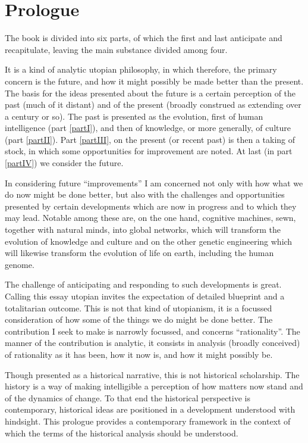 
\mainmatter

\part{Prologue}\label{part0}


The book is divided into six parts, of which the first and last anticipate and recapitulate, leaving the main substance divided among four.

It is a kind of analytic utopian philosophy, in which therefore, the primary concern is the future, and how it might possibly be made better than the present. 
The basis for the ideas presented about the future is a certain perception of the past (much of it distant) and of the present (broadly construed as extending over a century or so).
The past is presented as the evolution, first of human intelligence (part \ref{partI}), and then of knowledge, or more generally, of culture (part \ref{partII}).
Part \ref{partIII}, on the present (or recent past) is then a taking of stock, in which some opportunities for improvement are noted.
At last (in part \ref{partIV}) we consider the future.

In considering future ``improvements'' I am concerned not only with how what we do now might be done better, but also with the challenges and opportunities presented by certain developments which are now in progress and to which they may lead.
Notable among these are, on the one hand, cognitive machines, sewn, together with natural minds, into global networks, which will transform the evolution of knowledge and culture and on the other genetic engineering which will likewise transform the evolution of life on earth, including the human genome.

The challenge of anticipating and responding to such developments is great.
Calling this essay utopian invites the expectation of detailed blueprint and a totalitarian outcome.
This is not that kind of utopianism, it is a focussed consideration of how some of the things we do might be done better.
The contribution I seek to make is narrowly focussed, and concerns ``rationality''.
The manner of the contribution is analytic, it consists in analysis (broadly conceived) of rationality as it has been, how it now is, and how it might possibly be.

Though presented as a historical narrative, this is not historical scholarship.
The history is a way of making intelligible a perception of how matters now stand and of the dynamics of change.
To that end the historical perspective is contemporary, historical ideas are positioned in a development understood with hindsight.
This prologue provides a contemporary framework in the context of which the terms of the historical analysis should be understood.

